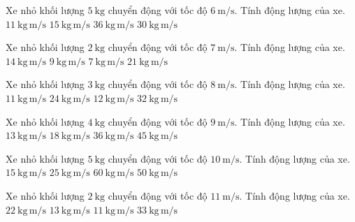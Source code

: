 \begin{ex}
Xe nhỏ khối lượng $5\ \mathrm{kg}$ chuyển động với tốc độ $6\ \mathrm{m/s}$. Tính động lượng của xe.
\choice
{$11\ \mathrm{kg\,m/s}$}
{$15\ \mathrm{kg\,m/s}$}
{$36\ \mathrm{kg\,m/s}$}
{\True $30\ \mathrm{kg\,m/s}$}
\end{ex}

\begin{ex}
Xe nhỏ khối lượng $2\ \mathrm{kg}$ chuyển động với tốc độ $7\ \mathrm{m/s}$. Tính động lượng của xe.
\choice
{\True $14\ \mathrm{kg\,m/s}$}
{$9\ \mathrm{kg\,m/s}$}
{$7\ \mathrm{kg\,m/s}$}
{$21\ \mathrm{kg\,m/s}$}
\end{ex}

\begin{ex}
Xe nhỏ khối lượng $3\ \mathrm{kg}$ chuyển động với tốc độ $8\ \mathrm{m/s}$. Tính động lượng của xe.
\choice
{$11\ \mathrm{kg\,m/s}$}
{\True $24\ \mathrm{kg\,m/s}$}
{$12\ \mathrm{kg\,m/s}$}
{$32\ \mathrm{kg\,m/s}$}
\end{ex}

\begin{ex}
Xe nhỏ khối lượng $4\ \mathrm{kg}$ chuyển động với tốc độ $9\ \mathrm{m/s}$. Tính động lượng của xe.
\choice
{$13\ \mathrm{kg\,m/s}$}
{$18\ \mathrm{kg\,m/s}$}
{\True $36\ \mathrm{kg\,m/s}$}
{$45\ \mathrm{kg\,m/s}$}
\end{ex}

\begin{ex}
Xe nhỏ khối lượng $5\ \mathrm{kg}$ chuyển động với tốc độ $10\ \mathrm{m/s}$. Tính động lượng của xe.
\choice
{$15\ \mathrm{kg\,m/s}$}
{$25\ \mathrm{kg\,m/s}$}
{$60\ \mathrm{kg\,m/s}$}
{\True $50\ \mathrm{kg\,m/s}$}
\end{ex}

\begin{ex}
Xe nhỏ khối lượng $2\ \mathrm{kg}$ chuyển động với tốc độ $11\ \mathrm{m/s}$. Tính động lượng của xe.
\choice
{\True $22\ \mathrm{kg\,m/s}$}
{$13\ \mathrm{kg\,m/s}$}
{$11\ \mathrm{kg\,m/s}$}
{$33\ \mathrm{kg\,m/s}$}
\end{ex}

